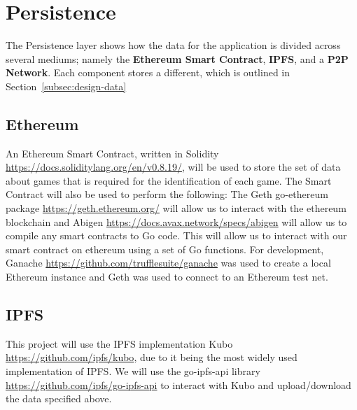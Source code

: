 
\section{Persistence}

The Persistence layer shows how the data for the application is divided across several mediums; namely the \textbf{Ethereum Smart Contract}, \textbf{IPFS}, and a \textbf{P2P Network}. Each component stores a different, which is outlined in Section~\ref{subsec:design-data}

\subsection{Ethereum}\label{subsubsec:impl-eth}

An Ethereum Smart Contract, written in Solidity \url{https://docs.soliditylang.org/en/v0.8.19/}, will be used to store the set of data about games that is required for the identification of each game. The Smart Contract will also be used to perform the following:
\x
The Geth go-ethereum package \url{https://geth.ethereum.org/} will allow us to interact with the ethereum blockchain and Abigen \url{https://docs.avax.network/specs/abigen} will allow us to compile any smart contracts to Go code. This will allow us to interact with our smart contract on ethereum using a set of Go functions. For development, Ganache \url{https://github.com/trufflesuite/ganache} was used to create a local Ethereum instance and Geth was used to connect to an Ethereum test net.


\subsection{IPFS}

This project will use the IPFS implementation Kubo \url{https://github.com/ipfs/kubo}, due to it being the most widely used implementation of IPFS. We will use the go-ipfs-api library \url{https://github.com/ipfs/go-ipfs-api} to interact with Kubo and upload/download the data specified above.

